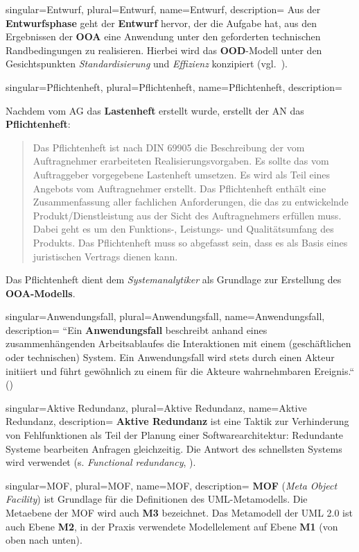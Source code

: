 {
singular={Entwurf},
plural={Entwurf},
name={Entwurf},
description={
Aus der \textbf{Entwurfsphase} geht der \textbf{Entwurf} hervor, der die Aufgabe hat, aus den Ergebnissen der \textbf{OOA} eine Anwendung unter den geforderten technischen Randbedingungen zu realisieren. Hierbei wird das \textbf{OOD}-Modell unter den Gesichtspunkten \textit{Standardisierung} und \textit{Effizienz} konzipiert (vgl.~\cite[13]{Bal05}).
}
}

{
singular={Pflichtenheft},
plural={Pflichtenheft},
name={Pflichtenheft},
description={
Nachdem vom AG das \textbf{Lastenheft} erstellt wurde, erstellt der AN das \textbf{Pflichtenheft}:
\blockquote[{\cite[306]{AABG14m}}]{
Das Pflichtenheft ist nach DIN 69905 die Beschreibung der vom Auftragnehmer erarbeiteten Realisierungsvorgaben. Es sollte das vom Auftraggeber vorgegebene
Lastenheft umsetzen. Es wird als Teil eines Angebots vom Auftragnehmer erstellt.
Das Pflichtenheft enthält eine Zusammenfassung aller fachlichen Anforderungen,
die das zu entwickelnde Produkt/Dienstleistung aus der Sicht des Auftragnehmers
erfüllen muss. Dabei geht es um den Funktions-, Leistungs- und Qualitätsumfang
des Produkts. Das Pflichtenheft muss so abgefasst sein, dass es als Basis eines juristischen Vertrags dienen kann.
}
\noindent
Das Pflichtenheft dient dem \textit{Systemanalytiker} als Grundlage zur Erstellung des \textbf{OOA-Modells}.
}
}

{
singular={Anwendungsfall},
plural={Anwendungsfall},
name={Anwendungsfall},
description={
``Ein \textbf{Anwendungsfall} beschreibt anhand eines zusammenhängenden Arbeitsablaufes die Interaktionen mit einem (geschäftlichen oder technischen) System. Ein Anwendungsfall wird stets durch einen Akteur initiiert und führt gewöhnlich zu einem für die Akteure wahrnehmbaren Ereignis.`` (\cite[351]{Oes05})
}
}

{
singular={Aktive Redundanz},
plural={Aktive Redundanz},
name={Aktive Redundanz},
description={
\textbf{Aktive Redundanz} ist eine Taktik zur Verhinderung von Fehlfunktionen als Teil der Planung einer Softwarearchitektur: Redundante Systeme bearbeiten Anfragen gleichzeitig. Die Antwort des schnellsten Systems wird verwendet (s. \textit{Functional redundancy}, \cite[90]{BCK12}).
}
}

{
singular={MOF},
plural={MOF},
name={MOF},
description={
\textbf{MOF} (\textit{Meta Object Facility}) ist Grundlage für die Definitionen des UML-Metamodells. Die Metaebene der MOF wird auch \textbf{M3} bezeichnet. Das Metamodell der UML 2.0 ist auch Ebene \textbf{M2}, in der Praxis verwendete Modellelement auf Ebene \textbf{M1} (von oben nach unten).
}
}


